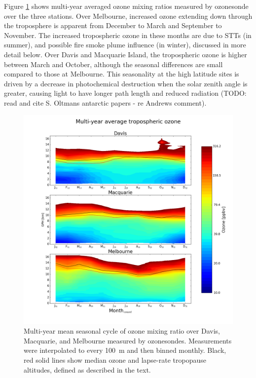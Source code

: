\documentclass{article}
\begin{document}
    Figure \ref{fig:seasonaltropozone} shows multi-year averaged ozone mixing ratios measured by ozonesonde over the three stations.
    Over Melbourne, increased ozone extending down through the troposphere is apparent from December to March and September to November.
    The increased tropospheric ozone in these months are due to STTs (in summer), and possible fire smoke plume influence (in winter), discussed in more detail below.
    Over Davis and Macquarie Island, the tropospheric ozone is higher between March and October, although the seasonal differences are small compared to those at Melbourne.
    This seasonality at the high latitude sites is driven by a decrease in photochemical destruction when the solar zenith angle is greater, causing light to have longer path length and reduced radiation (TODO: read and cite S. Oltmans antarctic papers - re Andrews comment).
    
    \begin{figure}[!htbp]
      \begin{center}
      \includegraphics[width=0.95\columnwidth]{figures/seasonaltropozone}
      \caption{
      Multi-year mean seasonal cycle of ozone mixing ratio over Davis, Macquarie, and Melbourne measured by ozonesondes.
      Measurements were interpolated to every 100~m and then binned monthly.
      Black, red solid lines show median ozone and lapse-rate tropopause altitudes, defined as described in the text.
      }
      \label{fig:seasonaltropozone}
      \end{center}
    \end{figure}
\end{document}

